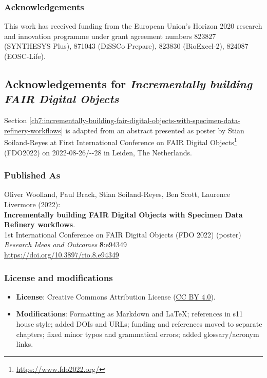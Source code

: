 \subsubsection*{Acknowledgements}

This work has received funding from the European Union's Horizon 2020
research and innovation programme under grant agreement numbers 823827
(SYNTHESYS Plus), 871043 (DiSSCo Prepare), 823830 (BioExcel-2), 824087
(EOSC-Life).




\subsection{Acknowledgements for \emph{Incrementally building FAIR Digital Objects}}\label{ch11:incrementally-fdo}

Section \vref{ch7:incrementally-building-fair-digital-objects-with-specimen-data-refinery-workflows}  is adapted from an abstract
presented as poster by Stian Soiland-Reyes at 
First International Conference on FAIR Digital Objects\footnote{\url{https://www.fdo2022.org/}}
(FDO2022) on
2022-08-26/-{}-28 in Leiden, The Netherlands. 

\subsubsection*{Published As}

Oliver Woolland, Paul Brack, Stian Soiland-Reyes, Ben Scott, Laurence
Livermore (2022):\\
\textbf{Incrementally building FAIR Digital Objects with Specimen Data
Refinery workflows}.\\
1st International Conference on FAIR Digital Objects
(FDO 2022) (poster)\\
\emph{Research Ideas and Outcomes} \textbf{8}:e94349\\
\url{https://doi.org/10.3897/rio.8.e94349}



\subsubsection*{License and modifications}

\begin{itemize}
\tightlist
\item
  \textbf{License}: Creative Commons Attribution License
  (\href{https://spdx.org/licenses/CC-BY-4.0}{CC BY 4.0}).
\item
  \textbf{Modifications}: Formatting as Markdown and LaTeX; references in s11 house style; added DOIs and URLs; funding and references moved to separate chapters; fixed minor typos and grammatical errors; added glossary/acronym links.
\end{itemize}


